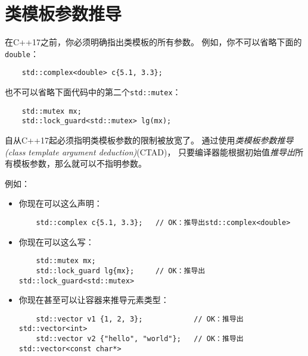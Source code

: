 \chapter{类模板参数推导}\label{ch9}
在C++17之前，你必须明确指出类模板的所有参数。
例如，你不可以省略下面的\texttt{double}：
\begin{lstlisting}
    std::complex<double> c{5.1, 3.3};
\end{lstlisting}
也不可以省略下面代码中的第二个\texttt{std::mutex}：
\begin{lstlisting}
    std::mutex mx;
    std::lock_guard<std::mutex> lg(mx);
\end{lstlisting}
自从C++17起必须指明类模板参数的限制被放宽了。
通过使用\emph{类模板参数推导(class template argument deduction)}(CTAD)，
只要编译器能根据初始值\emph{推导出}所有模板参数，那么就可以不指明参数。

例如：
\begin{itemize}
    \item 你现在可以这么声明：
    \begin{lstlisting}
    std::complex c{5.1, 3.3};   // OK：推导出std::complex<double>
    \end{lstlisting}
    \item 你现在可以这么写：
    \begin{lstlisting}
    std::mutex mx;
    std::lock_guard lg{mx};     // OK：推导出std::lock_guard<std::mutex>
    \end{lstlisting}
    \item 你现在甚至可以让容器来推导元素类型：
    \begin{lstlisting}
    std::vector v1 {1, 2, 3};            // OK：推导出std::vector<int>
    std::vector v2 {"hello", "world"};   // OK：推导出std::vector<const char*>
    \end{lstlisting}
\end{itemize}

